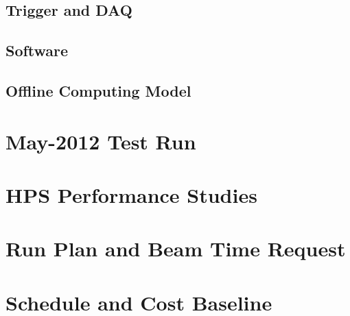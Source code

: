 \documentclass[prc,12pt,nofootinbib]{revtex4}
\begin{document}
\maketitle
\clearpage

\tableofcontents
\clearpage






\clearpage





\clearpage






\clearpage


\clearpage


\clearpage


\clearpage


\subsection{Trigger and DAQ }


\subsection{Software}


\subsection{Offline Computing Model}


\section{May-2012 Test Run}
\label{sec:testrun2012}

\clearpage

\section{HPS Performance Studies}
\label{sec:performance}


\clearpage




\section{Run Plan and Beam Time Request}


\section{Schedule and Cost Baseline}



\clearpage


%
\clearpage


\end{document}
